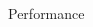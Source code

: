 \documentclass[unknownkeysallowed,final]{beamer}
\begin{document}
\begin{frame}{}
\begin{textblock}{17.3}
\begin{block}{\small{Performance}}
%
%

\end{block}
\end{textblock}
\end{frame}
\end{document}
